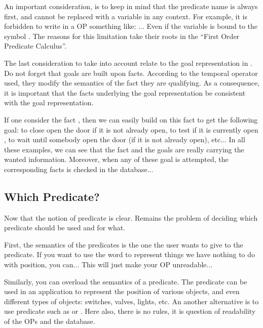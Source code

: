 An important consideration, is to keep in mind that the predicate name is
always first, and cannot be replaced with a variable in any context. For
example, it is forbidden to write in a OP something like: ... Even if the variable  is bound to the symbol .
The reasons for this limitation take their roots in the ``First Order Predicate
Calculus''.

The last consideration to take into account relate to the goal
representation in \COPRS{}. Do not forget that goals are built upon facts.
According to the temporal operator used, they modify the semantics of the
fact they are qualifying. As a consequence, it is important that the
facts underlying the goal representation be consistent with the goal
representation.

If one consider the fact , then we can easily
build on this fact to get the following goal:  to close open the door if it is not already open,  to test if it is currently open ,  to wait until somebody open the door (if it is not
already open), etc... In all these examples, we can see that the fact and
the goals are really carrying the wanted information. Moreover, when any
of these goal is attempted, the corresponding facts is checked in the
database...

\subsection{Which Predicate?}

Now that the notion of predicate is clear. Remains the problem of
deciding which predicate should be used and for what.

First, the semantics of the predicates is the one the user wants to give
to the predicate. If you want to use the word  to
represent things we have nothing to do with position, you can... This will
just make your OP unreadable...

Similarly, you can overload the semantics of a predicate. The predicate
 can be used in an application to represent the position
of various objects, and even different types of objects: switches,
valves, lights, etc. An another alternative is to use predicate such as
 or . Here also, there is no
rules, it is question of readability of the OPs and the database.

